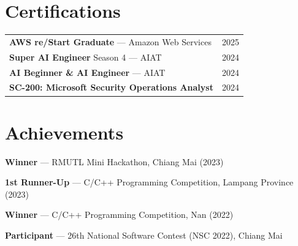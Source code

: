 \documentclass[10pt,a4paper]{article}
\begin{document}
\section{Certifications}

\renewcommand{\arraystretch}{1.3}
\begin{tabularx}{\linewidth}{X r}
  \textbf{AWS re/Start Graduate} --- Amazon Web Services
    & {\small\color{cvgray}2025} \\
  \textbf{Super AI Engineer} Season 4 --- AIAT
    & {\small\color{cvgray}2024} \\
  \textbf{AI Beginner \& AI Engineer} --- AIAT
    & {\small\color{cvgray}2024} \\
  \textbf{SC-200: Microsoft Security Operations Analyst}
    & {\small\color{cvgray}2024} \\
\end{tabularx}
\renewcommand{\arraystretch}{1}

\section{Achievements}

\begin{cvlist}
  \item \textbf{Winner} --- RMUTL Mini Hackathon, Chiang Mai (2023)
  \item \textbf{1st Runner-Up} --- C/C++ Programming Competition, Lampang Province (2023)
  \item \textbf{Winner} --- C/C++ Programming Competition, Nan (2022)
  \item \textbf{Participant} --- 26th National Software Contest (NSC 2022), Chiang Mai
\end{cvlist}
\end{document}
